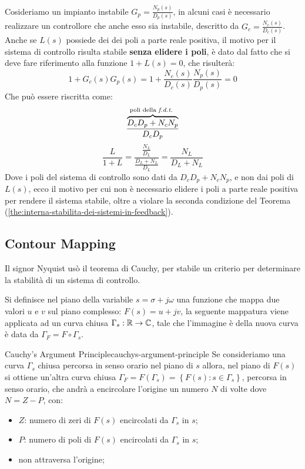 \documentclass[12pt]{article}
\begin{document}
Cosideriamo un impianto instabile $G_p = \frac{N_p(s)}{D_p(s)} $, in alcuni casi \`e necessario realizzare un controllore che anche esso sia instabile, descritto da $G_c = \frac{N_c(s)}{D_c(s)}$. Anche se $L(s)$ possiede dei dei poli a parte reale positiva, il motivo per il sistema di controllo risulta stabile \textbf{senza elidere i poli}, \`e dato dal fatto che si deve fare riferimento alla funzione $1 + L(s) = 0$, che risulter\`a:
\[ 1 +  G_c(s)G_p(s) = 1 + \frac{N_c(s)}{D_c(s)} \frac{N_p(s)}{D_p(s)} = 0  \]
Che pu\`o essere riscritta come:
\[ \frac{ \overbrace{D_cD_p + N_cN_p}^{\text{poli della \emph{f.d.t.} }} }{D_cD_p}  \]
\[ \frac{L}{1 + L}  = \frac{\frac{N_L}{D_L} }{\frac{D_L + N_L}{D_L} } = \frac{N_L}{D_L+N_L} \]
Dove i poli del sistema di controllo sono dati da $D_cD_p + N_cN_p$, e non dai poli di $L(s)$, ecco il motivo per cui non \`e necessario elidere i poli a parte reale positiva per rendere il sistema stabile, oltre a violare la seconda condizione del Teorema (\ref{the:interna-stabilita-dei-sistemi-in-feedback}).



\subsection{Contour Mapping}
Il signor Nyquist us\`o il teorema di Cauchy, per stabile un criterio per determinare la stabilit\`a di un sistema di controllo.

Si definisce nel piano della variabile $s = \sigma + j\omega$ una funzione che mappa due valori $u$ e $v$ sul piano complesso: $F(s) = u + jv$, la seguente mappatura viene applicata ad un curva chiusa $\Gamma_s : \mathbb{R} \to \mathbb{C}$, tale che l'immagine \`e della nuova curva \`e data da $\Gamma_F = F \circ \Gamma_s$.

\begin{theorem}{Cauchy's Argument Principle}{cauchys-argument-principle}
    Se consideriamo una curva $\Gamma_s$ chiusa percorsa in senso orario nel piano di $s$ allora, nel piano di $F(s)$ si ottiene un'altra curva chiusa $\Gamma_F = F(\Gamma_s) = \left\{ F(s) : s \in \Gamma_s \right\}$, percorsa in senso orario, che andr\`a a encircolare l'origine un numero $N$ di volte dove $N = Z - P$, con:
    \begin{itemize}
        \item $Z$: numero di zeri di $F(s)$ encircolati da $\Gamma_s$ in $s$;
        \item $P$: numero di poli di $F(s)$ encircolati da $\Gamma_s$ in $s$;
        \item non attraversa l'origine;
    \end{itemize}
\end{theorem}
\end{document}
